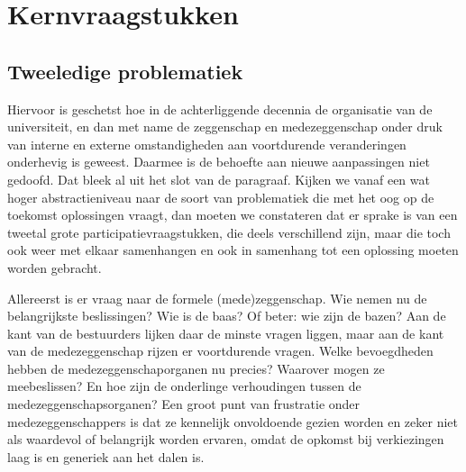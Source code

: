 \documentclass[empirical, authordate, ]{new-jote-article}
\begin{document}
	\section{Kernvraagstukken}



	\subsection{Tweeledige problematiek}



	Hiervoor is geschetst hoe in de achterliggende decennia de organisatie van de universiteit, en dan met name de zeggenschap en medezeggenschap onder druk van interne en externe omstandigheden aan voortdurende veranderingen onderhevig is geweest. Daarmee is de behoefte aan nieuwe aanpassingen niet gedoofd. Dat bleek al uit het slot van de paragraaf. Kijken we vanaf een wat hoger abstractieniveau naar de soort van problematiek die met het oog op de toekomst oplossingen vraagt, dan moeten we constateren dat er sprake is van een tweetal grote participatievraagstukken, die deels verschillend zijn, maar die toch ook weer met elkaar samenhangen en ook in samenhang tot een oplossing moeten worden gebracht.



	Allereerst is er vraag naar de formele (mede)zeggenschap. Wie nemen nu de belangrijkste beslissingen? Wie is de baas? Of beter: wie zijn de bazen? Aan de kant van de bestuurders lijken daar de minste vragen liggen, maar aan de kant van de medezeggenschap rijzen er voortdurende vragen. Welke bevoegdheden hebben de medezeggenschaporganen nu precies? Waarover mogen ze meebeslissen? En hoe zijn de onderlinge verhoudingen tussen de medezeggenschapsorganen? Een groot punt van frustratie onder medezeggenschappers is dat ze kennelijk onvoldoende gezien worden en zeker niet als waardevol of belangrijk worden ervaren, omdat de opkomst bij verkiezingen laag is en generiek aan het dalen is.
\end{document}

